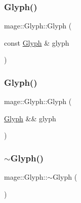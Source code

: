 \hypertarget{structmage_1_1_glyph_a0ab4ca5253ac80f8849c7d56c0301d61}{}\label{structmage_1_1_glyph_a0ab4ca5253ac80f8849c7d56c0301d61} 
\subsubsection{\texorpdfstring{Glyph()}{Glyph()}\hspace{0.1cm}{\footnotesize\ttfamily [2/3]}}
{\footnotesize\ttfamily mage\+::\+Glyph\+::\+Glyph (\begin{DoxyParamCaption}\item[{const \hyperlink{structmage_1_1_glyph}{Glyph} \&}]{glyph }\end{DoxyParamCaption})\hspace{0.3cm}{\ttfamily [default]}}

\hypertarget{structmage_1_1_glyph_a4b7ae94678d53ff2978635321e8f1144}{}\label{structmage_1_1_glyph_a4b7ae94678d53ff2978635321e8f1144} 
\subsubsection{\texorpdfstring{Glyph()}{Glyph()}\hspace{0.1cm}{\footnotesize\ttfamily [3/3]}}
{\footnotesize\ttfamily mage\+::\+Glyph\+::\+Glyph (\begin{DoxyParamCaption}\item[{\hyperlink{structmage_1_1_glyph}{Glyph} \&\&}]{glyph }\end{DoxyParamCaption})\hspace{0.3cm}{\ttfamily [default]}}

\hypertarget{structmage_1_1_glyph_aa8e903334e77cc2930149923461d06ab}{}\label{structmage_1_1_glyph_aa8e903334e77cc2930149923461d06ab} 
\subsubsection{\texorpdfstring{$\sim$\+Glyph()}{~Glyph()}}
{\footnotesize\ttfamily mage\+::\+Glyph\+::$\sim$\+Glyph (\begin{DoxyParamCaption}{ }\end{DoxyParamCaption})\hspace{0.3cm}{\ttfamily [default]}}



